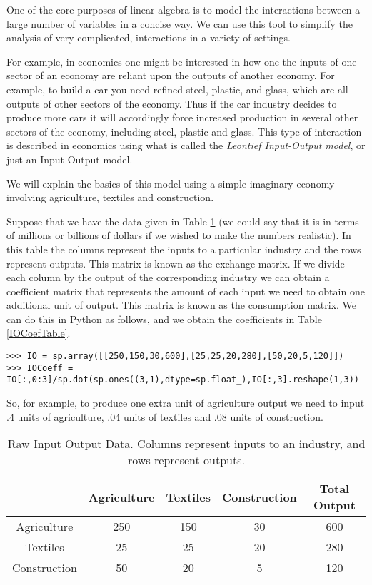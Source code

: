\label{Leontief}


One of the core purposes of linear algebra is to model the interactions between a large number of variables in a concise way.
We can use this tool to simplify the analysis of very complicated, interactions in a variety of settings.

For example, in economics one might be interested in how one the inputs of one sector of an economy are reliant upon the outputs of another economy.
For example, to build a car you need refined steel, plastic, and glass, which are all outputs of other sectors of the economy.
Thus if the car industry decides to produce more cars it will accordingly force increased production in several other sectors of the economy, including steel, plastic and glass.
This type of interaction is described in economics using what is called the \emph{Leontief Input-Output model}, or just an Input-Output model.

We will explain the basics of this model using a simple imaginary economy involving agriculture, textiles and construction.

Suppose that we have the data given in Table \ref{IORawTable} (we could say that it is in terms of millions or billions of dollars if we wished to make the numbers realistic).
In this table the columns represent the inputs to a particular industry and the rows represent outputs.
This matrix is known as the exchange matrix.
If we divide each column by the output of the corresponding industry we can obtain a coefficient matrix that represents the amount of each input we need to obtain one additional unit of output.
This matrix is known as the consumption matrix.
We can do this in Python as follows, and we obtain the coefficients in Table \ref{IOCoefTable}.

\begin{lstlisting}
>>> IO = sp.array([[250,150,30,600],[25,25,20,280],[50,20,5,120]])
>>> IOCoeff = IO[:,0:3]/sp.dot(sp.ones((3,1),dtype=sp.float_),IO[:,3].reshape(1,3))
\end{lstlisting}
So, for example, to produce one extra unit of agriculture output we need to input .4 units of agriculture, .04 units of textiles and .08 units of construction.

\begin{table}
\begin{center}
\begin{tabular}{|c|c|c|c|c|}
\hline
& Agriculture & Textiles & Construction & Total Output \\ \hline
Agriculture & 250 & 150 & 30 & 600 \\ \hline
Textiles & 25 & 25 & 20 & 280 \\ \hline
Construction & 50 & 20 & 5 & 120 \\ \hline
\end{tabular}
\caption{Raw Input Output Data.
Columns represent inputs to an industry, and rows represent outputs.}  \label{IORawTable}
\end{center}
\end{table}

